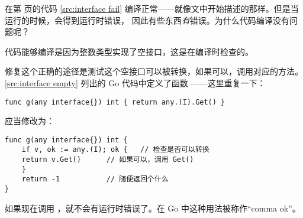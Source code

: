\begin{Exercise}[title={接口和编译},difficulty=1]
\Question
在第 \pageref{src:interface fail} 页的代码 \ref{src:interface fail} 
编译正常——就像文中开始描述的那样。但是当运行的时候，会得到运行时错误，
因此有些东西\emph{有}错误。为什么代码编译没有问题呢？
\end{Exercise}

\begin{Answer}
\Question
代码能够编译是因为整数类型实现了空接口，这是在编译时检查的。

修复这个正确的途径是测试这个空接口可以被转换，如果可以，调用对应的方法。
\ref{src:interface empty} 列出的 Go 代码中定义了函数 ——这里重复一下：
\begin{lstlisting}
func g(any interface{}) int { return any.(I).Get() }
\end{lstlisting}

\noindent{}应当修改为：
\begin{lstlisting}
func g(any interface{}) int {
    if v, ok := any.(I); ok {	// 检查是否可以转换
	return v.Get()		// 如果可以，调用 Get()
    }
    return -1			// 随便返回个什么
}
\end{lstlisting}
如果现在调用 ，就不会有运行时错误了。在 Go 中这种用法被称作``comma ok''。
\end{Answer}
